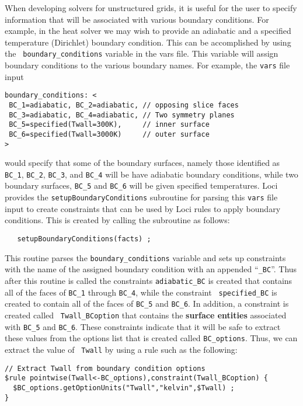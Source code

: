 \documentclass[10pt,epsf,letterpaper,twoside]{book}
\begin{document}
When developing solvers for unstructured grids, it is useful for the
user to specify information that will be associated with various
boundary conditions.  For example, in the heat solver we may wish to
provide an adiabatic and a specified temperature (Dirichlet) boundary
condition.  This can be accomplished by using the {\tt
  boundary\_conditions} variable in the vars file.  This variable will
assign boundary conditions to the various boundary names.  For
example, the {\tt vars} file input
\begin{verbatim}
boundary_conditions: <
 BC_1=adiabatic, BC_2=adiabatic, // opposing slice faces
 BC_3=adiabatic, BC_4=adiabatic, // Two symmetry planes
 BC_5=specified(Twall=300K),     // inner surface
 BC_6=specified(Twall=3000K)     // outer surface
>
\end{verbatim}
would specify that some of the boundary surfaces, namely those
identified as {\tt BC\_1}, {\tt BC\_2}, {\tt BC\_3}, and {\tt BC\_4}
will be have adiabatic boundary conditions, while two boundary
surfaces, {\tt BC\_5} and {\tt BC\_6} will be given specified
temperatures.  Loci provides the {\tt setupBoundaryConditions}
subroutine for parsing this {\tt vars} file input to create
constraints that can be used by Loci rules to apply boundary
conditions.  This is created by calling the subroutine as follows:
\begin{verbatim}
   setupBoundaryConditions(facts) ;
\end{verbatim}
This routine parses the {\tt boundary\_conditions} variable and sets
up constraints with the name of the assigned boundary condition with
an appended ``{\tt \_BC}''.  Thus after this routine is called the
constraints {\tt adiabatic\_BC} is created that contains all of the
faces of {\tt BC\_1} through {\tt BC\_4}, while the constraint {\tt
  specified\_BC} is created to contain all of the faces of {\tt BC\_5}
and {\tt BC\_6}.  In addition, a constraint is created called {\tt
  Twall\_BCoption} that contains the {\bf surface entities} associated with
{\tt BC\_5} and {\tt BC\_6}.  These constraints indicate that it will
be safe to extract these values from the options list that is created
called {\tt BC\_options}.  Thus, we can extract the value of {\tt
  Twall} by using a rule such as the following:
\newpage
\begin{verbatim}
// Extract Twall from boundary condition options
$rule pointwise(Twall<-BC_options),constraint(Twall_BCoption) {
  $BC_options.getOptionUnits("Twall","kelvin",$Twall) ;
}
\end{verbatim}
\end{document}

